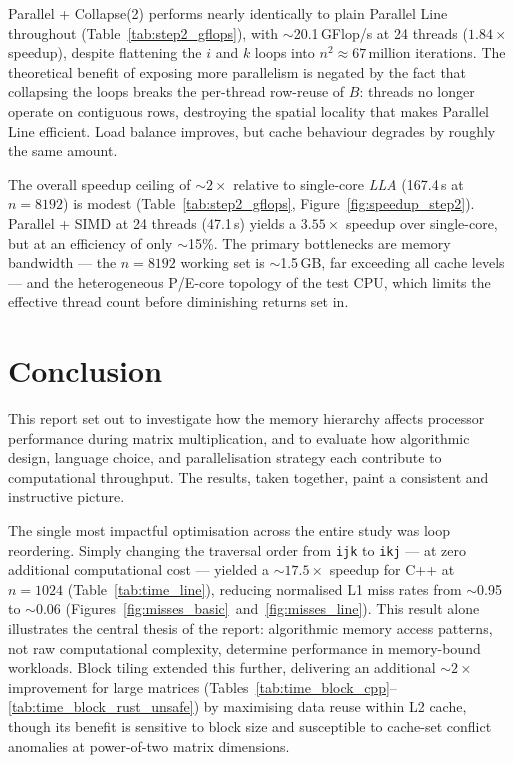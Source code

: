 \documentclass[12pt,a4paper]{article}
\begin{document}
Parallel + Collapse(2) performs nearly identically to plain Parallel Line
throughout (Table~\ref{tab:step2_gflops}), with $\sim$20.1\,GFlop/s at 24 threads ($1.84\times$ speedup), despite
flattening the $i$ and $k$ loops into $n^2 \approx 67$\,million iterations.
The theoretical benefit of exposing more parallelism is negated by the fact
that collapsing the loops breaks the per-thread row-reuse of $B$: threads no
longer operate on contiguous rows, destroying the spatial locality that makes
Parallel Line efficient. Load balance improves, but cache behaviour degrades
by roughly the same amount.

The overall speedup ceiling of $\sim$$2\times$ relative to single-core
\textit{LLA} (167.4\,s at $n = 8192$) is modest (Table~\ref{tab:step2_gflops},
Figure~\ref{fig:speedup_step2}). Parallel + SIMD at 24
threads (47.1\,s) yields a $3.55\times$ speedup over single-core, but at an
efficiency of only $\sim$15\%. The primary bottlenecks are memory bandwidth
--- the $n = 8192$ working set is $\sim$1.5\,GB, far exceeding all cache
levels --- and the heterogeneous P/E-core topology of the test CPU, which
limits the effective thread count before diminishing returns set in.

\section{Conclusion}
\label{sec:conclusion}

This report set out to investigate how the memory hierarchy affects processor
performance during matrix multiplication, and to evaluate how algorithmic
design, language choice, and parallelisation strategy each contribute to
computational throughput. The results, taken together, paint a consistent and
instructive picture.

The single most impactful optimisation across the entire study was loop
reordering. Simply changing the traversal order from \texttt{ijk} to
\texttt{ikj} --- at zero additional computational cost --- yielded a
$\sim$$17.5\times$ speedup for C++ at $n = 1024$ (Table~\ref{tab:time_line}),
reducing normalised L1 miss rates from $\sim$0.95 to $\sim$0.06
(Figures~\ref{fig:misses_basic}~and~\ref{fig:misses_line}). This result alone illustrates the
central thesis of the report: algorithmic memory access patterns, not raw
computational complexity, determine performance in memory-bound workloads.
Block tiling extended this further, delivering an additional $\sim$$2\times$
improvement for large matrices (Tables~\ref{tab:time_block_cpp}--\ref{tab:time_block_rust_unsafe}) by maximising data reuse within L2 cache,
though its benefit is sensitive to block size and susceptible to cache-set
conflict anomalies at power-of-two matrix dimensions.
\end{document}
